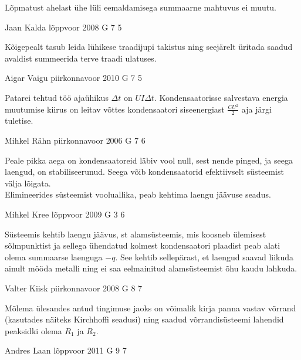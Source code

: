 \documentclass[11pt, twoside]{article}
\begin{document}
{{\ifHint
Lõpmatust ahelast ühe lüli eemaldamisega summaarne mahtuvus ei muutu.
\fi
}

{Jaan Kalda} %
{lõppvoor} %
{2008} %
{G 7} %
{5} %
{

\ifHint
Kõigepealt tasub leida lühikese traadijupi takistus ning seejärelt üritada saadud avaldist summeerida terve traadi ulatuses.
\fi
}

{Aigar Vaigu} %
{piirkonnavoor} %
{2010} %
{G 7} %
{5} %
{

\ifHint
Patarei tehtud töö ajaühikus $\Delta t$ on $UI\Delta t$. Kondensaatorisse salvestava energia muutumise kiirus on leitav võttes kondensaatori siseenergiast $\frac{CU^2}{2}$ aja järgi tuletise.
\fi
}

{Mihkel Rähn} %
{piirkonnavoor} %
{2006} %
{G 7} %
{6} %
{

\ifHint
\osa\osa Peale pikka aega on kondensaatoreid läbiv vool null, sest nende pinged, ja seega laengud, on stabiliseerunud. Seega võib kondensaatorid efektiivselt süsteemist välja lõigata.\\
\osa Elimineerides süsteemist vooluallika, peab kehtima laengu jäävuse seadus.
\fi
}

{Mihkel Kree} %
{lõppvoor} %
{2009} %
{G 3} %
{6} %
{

\ifHint
Süsteemis kehtib laengu jäävus, st alamsüsteemis, mis koosneb ülemisest sõlmpunktist ja sellega ühendatud kolmest kondensaatori plaadist peab alati olema summaarse laenguga $-q$. See kehtib sellepärast, et laengud saavad liikuda ainult mööda metalli ning ei saa eelmainitud alamsüsteemist õhu kaudu lahkuda.
\fi
}

{Valter Kiisk} %
{piirkonnavoor} %
{2008} %
{G 8} %
{7} %
{

\ifHint
Mõlema ülesandes antud tingimuse jaoks on võimalik kirja panna vastav võrrand (kasutades näiteks Kirchhoffi seadusi) ning saadud võrrandisüsteemi lahendid peaksidki olema $R_1$ ja $R_2$.
\fi
}

{Andres Laan} %
{lõppvoor} %
{2011} %
{G 9} %
{7} %
{

}}
\end{document}
